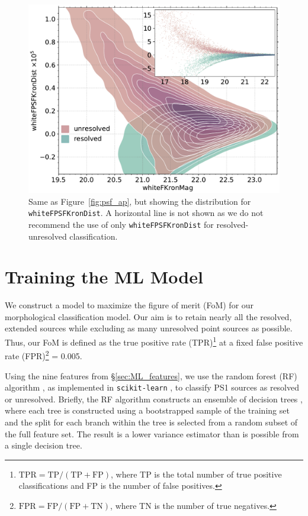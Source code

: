 \documentclass[twocolumn]{aastex63}
\begin{document}
\begin{figure}
    \centering
    \includegraphics[width=\columnwidth]{./figures/whiteFPSFKronDist.pdf}
    \caption{Same as Figure~\ref{fig:psf_ap}, but showing the distribution for
    \texttt{whiteFPSFKronDist}. A horizontal line is not shown as we do not
    recommend the use of only \texttt{whiteFPSFKronDist} for
    resolved-unresolved classification.}
    \label{fig:psf_kron}
\end{figure}  

\section{Training the ML Model}\label{sec:ML_model}

We construct a model to maximize the figure of merit (FoM) for our
morphological classification model. Our aim is to retain nearly all the
resolved, extended sources while excluding as many unresolved point sources as
possible. Thus, our FoM is defined as the true positive rate
(TPR)\footnote{$\mathrm{TPR} = \mathrm{TP}/(\mathrm{TP} + \mathrm{FP})$, where
TP is the total number of true positive classifications and FP is the number
of false positives.} at a fixed false positive rate
(FPR)\footnote{$\mathrm{FPR} = \mathrm{FP}/(\mathrm{FP}+\mathrm{TN})$, where
TN is the number of true negatives.} = 0.005.

Using the nine features from \S\ref{sec:ML_features}, we use the random forest
(RF) algorithm \citep{Breiman01}, as implemented in \texttt{scikit-learn}
\citep{Pedregosa11}, to classify PS1 sources as resolved or unresolved.
Briefly, the RF algorithm constructs an ensemble of decision trees
\citep{Breiman84}, where each tree is constructed using a bootstrapped sample
of the training set \citep[a method known as ``bagging'';][]{Breiman96} and
the split for each branch within the tree is selected from a random subset of
the full feature set. The result is a lower variance estimator than is
possible from a single decision tree.
\end{document}
